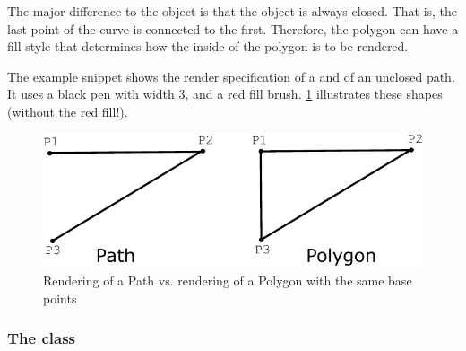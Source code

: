 The major difference to the \RenderCurve 
object is that the object is always closed. 
That is, the last point of the curve is connected to the first.
Therefore, the polygon can have a fill style 
that determines how the inside of the polygon is to be rendered.

The example snippet shows the render specification of a \Polygon and of an unclosed path. It uses a 
black pen with width 3, and a red fill brush. \ref{PathVsPolygon} illustrates these shapes (without the red fill!).

{\footnotesize
{}
}

\begin{figure}[!h]
\begin{center}
\includegraphics{figures/PathVsPolygon.pdf}
\end{center}
\caption{Rendering of a Path vs. rendering of a Polygon with the same base points}
\label{PathVsPolygon}
\end{figure}



\subsubsection{The  class}
\label{renderrectangle-class}

